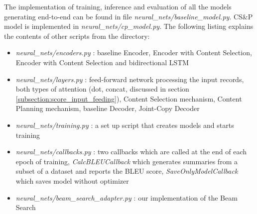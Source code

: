 The implementation of training, inference and evaluation of all the models generating end-to-end can be found in file \emph{neural\_nets/baseline\_model.py}. CS\&P model is implemented in \emph{neural\_nets/cp\_model.py}. The following listing explains the contents of other scripts from the directory:
\begin{itemize}
    \item \emph{neural\_nets/encoders.py} : baseline Encoder, Encoder with Content Selection, Encoder with Content Selection and bidirectional LSTM
    \item \emph{neural\_nets/layers.py} : feed-forward network processing the input records, both types of attention (dot, concat, discussed in section \ref{subsection:score_input_feeding}), Content Selection mechanism, Content Planning mechanism, baseline Decoder, Joint-Copy Decoder
    \item \emph{neural\_nets/training.py} : a set up script that creates models and starts training
    \item \emph{neural\_nets/callbacks.py} : two callbacks which are called at the end of each epoch of training, \emph{CalcBLEUCallback} which generates summaries from a subset of a dataset and reports the BLEU score, \emph{SaveOnlyModelCallback} which saves model without optimizer
    \item \emph{neural\_nets/beam\_search\_adapter.py} : our implementation of the Beam \linebreak Search
\end{itemize}

